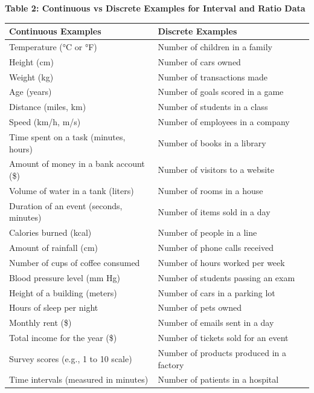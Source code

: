\documentclass[12pt,a4paper]{book}
\begin{document}
\vspace{1cm}

\textbf{Table 2: Continuous vs Discrete Examples for Interval and Ratio Data}

\vspace{0.5cm}

\begin{table}[h!]
\centering
\begin{tabular}{|p{8cm}|p{8cm}|}
\hline
\textbf{Continuous Examples} & \textbf{Discrete Examples} \\
\hline
Temperature (°C or °F) & Number of children in a family \\
Height (cm) & Number of cars owned \\
Weight (kg) & Number of transactions made \\
Age (years) & Number of goals scored in a game \\
Distance (miles, km) & Number of students in a class \\
Speed (km/h, m/s) & Number of employees in a company \\
Time spent on a task (minutes, hours) & Number of books in a library \\
Amount of money in a bank account (\$) & Number of visitors to a website \\
Volume of water in a tank (liters) & Number of rooms in a house \\
Duration of an event (seconds, minutes) & Number of items sold in a day \\
Calories burned (kcal) & Number of people in a line \\
Amount of rainfall (cm) & Number of phone calls received \\
Number of cups of coffee consumed & Number of hours worked per week \\
Blood pressure level (mm Hg) & Number of students passing an exam \\
Height of a building (meters) & Number of cars in a parking lot \\
Hours of sleep per night & Number of pets owned \\
Monthly rent (\$) & Number of emails sent in a day \\
Total income for the year (\$) & Number of tickets sold for an event \\
Survey scores (e.g., 1 to 10 scale) & Number of products produced in a factory \\
Time intervals (measured in minutes) & Number of patients in a hospital \\

\end{tabular}
\end{table}
\end{document}

